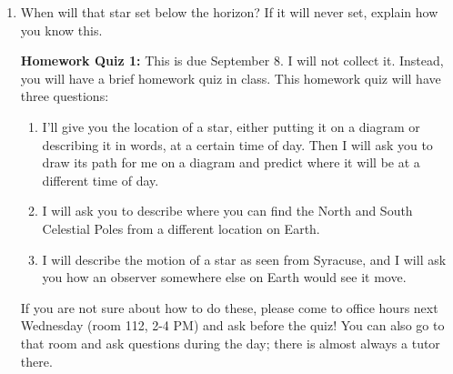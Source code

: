 \documentclass[12pt]{article}
\newcommand{\insp}{\vspace{1in}}
\begin{document}
\begin{enumerate}
	\item When will that star set below the horizon? If it will never set, explain how you know this.
	
	\insp\bigskip
	
	{\bf Homework Quiz 1:} This is due September 8. I will not collect it. Instead, you will have a brief homework quiz in class. This homework quiz will have three questions:
	
	\begin{enumerate}
		\item I'll give you the location of a star, either putting it on a diagram or describing it in words, at a certain time of day. Then I will ask you to draw its path for me on a diagram and predict where it will be at a different time of day.
		\item I will ask you to describe where you can find the North and South Celestial Poles from a different location on Earth.
		\item I will describe the motion of a star as seen from Syracuse, and I will ask you how an observer somewhere else on Earth would see it move.
	\end{enumerate}

If you are not sure about how to do these, please come to office hours next Wednesday (room 112, 2-4 PM) and ask before the quiz! You can also go to that room and ask questions during the day; there is almost always a tutor there.
	
\end{enumerate}	

	
\end{document}

